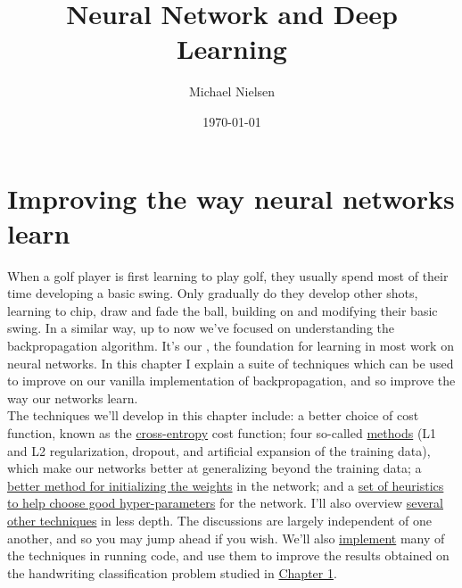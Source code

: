 \documentclass[a4paper,11pt,twoside]{report}
\date{\today}
\author{Michael Nielsen}
\title{Neural Network and Deep Learning}
\begin{document}

\maketitle
\newpage


\tableofcontents


\newpage







\chapter{Improving the way neural networks learn}
\label{chap: Improving the way neural networks learn}

When a golf player is first learning to play golf, they usually spend most of their time developing a basic swing. Only gradually do they develop other shots, learning to chip, draw and fade the ball, building on and modifying their basic swing. In a similar way, up to now we've focused on understanding the backpropagation algorithm. It's our , the foundation for learning in most work on neural networks. In this chapter I explain a suite of techniques which can be used to improve on our vanilla implementation of backpropagation, and so improve the way our networks learn.\\

The techniques we'll develop in this chapter include: a better choice of cost function, known as the \hyperref[sec: The cross-entropy cost function]{cross-entropy} cost function; four so-called \hyperref[sec: Overfitting and regularization]{ methods} (L1 and L2 regularization, dropout, and artificial expansion of the training data), which make our networks better at generalizing beyond the training data; a \hyperref[sec: Weight initialization]{better method for initializing the weights} in the network; and a \hyperref[sec: How to choose a neural network's hyper-parameters?]{set of heuristics to help choose good hyper-parameters} for the network. I'll also overview \hyperref[sec: Other techniques]{several other techniques} in less depth. The discussions are largely independent of one another, and so you may jump ahead if you wish. We'll also \hyperref[sec: Handwriting recognition revisited: the code]{implement} many of the techniques in running code, and use them to improve the results obtained on the handwriting classification problem studied in \hyperref[chap: NN Handwriting]{Chapter 1}.\\
\end{document}
